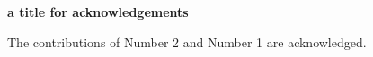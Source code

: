 \begin{center}
\textbf{\large a title for acknowledgements}
\end{center}

The contributions of Number 2 and Number 1 are acknowledged.
